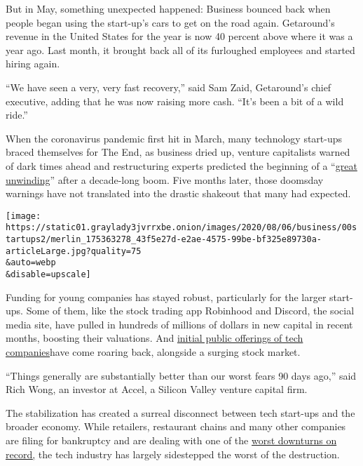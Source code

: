 But in May, something unexpected happened: Business bounced back when
people began using the start-up's cars to get on the road again.
Getaround's revenue in the United States for the year is now 40 percent
above where it was a year ago. Last month, it brought back all of its
furloughed employees and started hiring again.

``We have seen a very, very fast recovery,'' said Sam Zaid, Getaround's
chief executive, adding that he was now raising more cash. ``It's been a
bit of a wild ride.''

When the coronavirus pandemic first hit in March, many technology
start-ups braced themselves for The End, as business dried up, venture
capitalists warned of dark times ahead and restructuring experts
predicted the beginning of a
``\href{https://www.nytimes3xbfgragh.onion/2020/04/01/technology/virus-start-ups-pummeled-layoffs-unwinding.html}{great
unwinding}'' after a decade-long boom. Five months later, those doomsday
warnings have not translated into the drastic shakeout that many had
expected.

\texttt{[image: https://static01.graylady3jvrrxbe.onion/images/2020/08/06/business/00startups2/merlin\_175363278\_43f5e27d-e2ae-4575-99be-bf325e89730a-articleLarge.jpg?quality=75\\\&auto=webp\\\&disable=upscale]}

Funding for young companies has stayed robust, particularly for the
larger start-ups. Some of them, like the stock trading app Robinhood and
Discord, the social media site, have pulled in hundreds of millions of
dollars in new capital in recent months, boosting their valuations. And
\href{https://www.nytimes3xbfgragh.onion/2020/06/17/technology/ipo-pandemic.html}{initial
public offerings of tech companies}have come roaring back, alongside a
surging stock market.

``Things generally are substantially better than our worst fears 90 days
ago,'' said Rich Wong, an investor at Accel, a Silicon Valley venture
capital firm.

The stabilization has created a surreal disconnect between tech
start-ups and the broader economy. While retailers, restaurant chains
and many other companies are filing for bankruptcy and are dealing with
one of the
\href{https://www.nytimes3xbfgragh.onion/live/2020/07/30/business/stock-market-today-coronavirus/the-us-economys-contraction-in-the-second-quarter-was-the-worst-on-record}{worst
downturns on
record}\href{https://www.nytimes3xbfgragh.onion/2020/07/30/business/economy/q2-gdp-coronavirus-economy.html}{,}
the tech industry has largely sidestepped the worst of the destruction.

